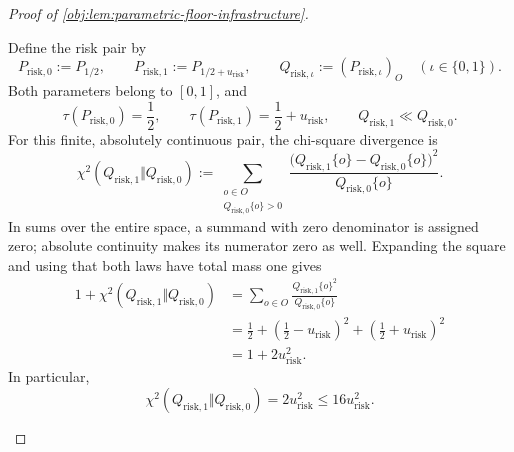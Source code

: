 \documentclass[11pt]{article}
\begin{document}
\begin{proof}[Proof of \cref{obj:lem:parametric-floor-infrastructure}]
\begin{enumerate}
Define the risk pair by
\[
P_{\mathrm{risk},0}:=P_{1/2},
\qquad
P_{\mathrm{risk},1}:=P_{1/2+u_{\mathrm{risk}}},
\qquad
Q_{\mathrm{risk},\iota}:=(P_{\mathrm{risk},\iota})_O
\quad(\iota\in\{0,1\}).
\]
Both parameters belong to \([0,1]\), and
\[
\tau(P_{\mathrm{risk},0})=\frac12,
\qquad
\tau(P_{\mathrm{risk},1})=\frac12+u_{\mathrm{risk}},
\qquad
Q_{\mathrm{risk},1}\ll Q_{\mathrm{risk},0}.
\]
For this finite, absolutely continuous pair, the chi-square divergence is
\[
\chi^2(Q_{\mathrm{risk},1}\Vert Q_{\mathrm{risk},0})
:=
\sum_{\substack{o\in O\\Q_{\mathrm{risk},0}\{o\}>0}}
\frac{\bigl(Q_{\mathrm{risk},1}\{o\}
             -Q_{\mathrm{risk},0}\{o\}\bigr)^2}
     {Q_{\mathrm{risk},0}\{o\}}.
\]
In sums over the entire space, a summand with zero denominator is assigned zero; absolute continuity makes its numerator zero as well. Expanding the square and using that both laws have total mass one gives
\[
\begin{aligned}
1+\chi^2(Q_{\mathrm{risk},1}\Vert Q_{\mathrm{risk},0})
&=
\sum_{o\in O}
\frac{Q_{\mathrm{risk},1}\{o\}^2}
     {Q_{\mathrm{risk},0}\{o\}}\\
&=
\frac12+
\left(\frac12-u_{\mathrm{risk}}\right)^2+
\left(\frac12+u_{\mathrm{risk}}\right)^2\\
&=1+2u_{\mathrm{risk}}^2.
\end{aligned}
\]
In particular,
\[
\chi^2(Q_{\mathrm{risk},1}\Vert Q_{\mathrm{risk},0})
=2u_{\mathrm{risk}}^2
\le16u_{\mathrm{risk}}^2.
\]


\end{enumerate}
\end{proof}
\end{document}

